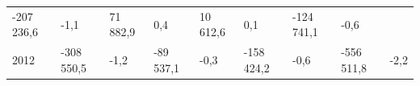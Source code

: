 \begin{longtable}[]{@{}lllllllll@{}}
\begin{minipage}[t]{0.10\columnwidth}
-207 236,6\strut
\end{minipage} & \begin{minipage}[t]{0.06\columnwidth}\raggedright
-1,1\strut
\end{minipage} & \begin{minipage}[t]{0.16\columnwidth}\raggedright
71 882,9\strut
\end{minipage} & \begin{minipage}[t]{0.06\columnwidth}\raggedright
0,4\strut
\end{minipage} & \begin{minipage}[t]{0.12\columnwidth}\raggedright
10 612,6\strut
\end{minipage} & \begin{minipage}[t]{0.06\columnwidth}\raggedright
0,1\strut
\end{minipage} & \begin{minipage}[t]{0.10\columnwidth}\raggedright
-124 741,1\strut
\end{minipage} & \begin{minipage}[t]{0.06\columnwidth}\raggedright
-0,6\strut
\end{minipage}\tabularnewline
\begin{minipage}[t]{0.05\columnwidth}\raggedright
2012\strut
\end{minipage} & \begin{minipage}[t]{0.10\columnwidth}\raggedright
-308 550,5\strut
\end{minipage} & \begin{minipage}[t]{0.06\columnwidth}\raggedright
-1,2\strut
\end{minipage} & \begin{minipage}[t]{0.16\columnwidth}\raggedright
-89 537,1\strut
\end{minipage} & \begin{minipage}[t]{0.06\columnwidth}\raggedright
-0,3\strut
\end{minipage} & \begin{minipage}[t]{0.12\columnwidth}\raggedright
-158 424,2\strut
\end{minipage} & \begin{minipage}[t]{0.06\columnwidth}\raggedright
-0,6\strut
\end{minipage} & \begin{minipage}[t]{0.10\columnwidth}\raggedright
-556 511,8\strut
\end{minipage} & \begin{minipage}[t]{0.06\columnwidth}\raggedright
-2,2\strut
\end{minipage}\tabularnewline

\end{longtable}
